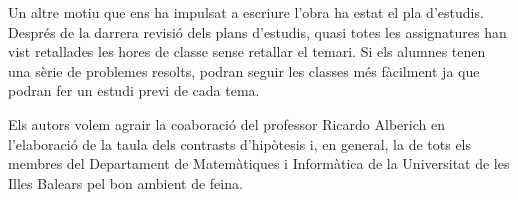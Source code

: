 Un altre motiu que ens ha impulsat a escriure l'obra ha estat el pla
d'estudis. Despr\'es de la darrera revisi\'o dels plans d'estudis, quasi
totes les assignatures han vist retallades les hores de classe sense
retallar el temari. Si els alumnes tenen una s\`erie de problemes
resolts, podran seguir les classes m\'es f\`acilment ja que podran
fer un estudi previ de cada tema.

Els autors volem agrair la co{\lgem}aboraci\'o del professor Ricardo
Alberich en l'elaboraci\'o de la taula dels contrasts d'hip\`otesis
i, en general, la de tots els membres del Departament de Matem\`atiques i
Inform\`atica de la Universitat de les Illes Balears pel bon ambient de
feina.

\cleardoublepage
